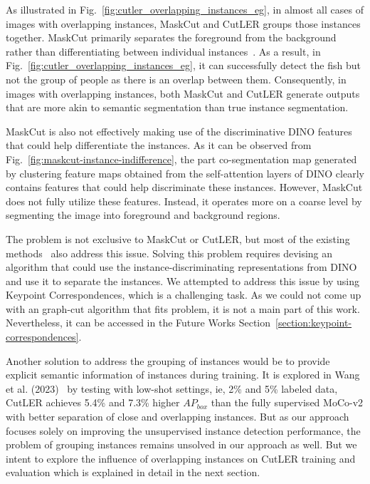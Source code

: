 As illustrated in Fig.~\ref{fig:cutler_overlapping_instances_eg}, in almost all cases of images with overlapping instances, MaskCut and CutLER groups those instances together. MaskCut primarily separates the foreground from the background rather than differentiating between individual instances~\cite{engstler2023understanding}. As a result, in Fig.~\ref{fig:cutler_overlapping_instances_eg}, it can successfully detect the fish but not the group of people as there is an overlap between them. Consequently, in images with overlapping instances, both MaskCut and CutLER generate outputs that are more akin to semantic segmentation than true instance segmentation.

MaskCut is also not effectively making use of the discriminative  DINO features that could help differentiate the instances. As it can be observed from Fig.~\ref{fig:maskcut-instance-indifference}, the part co-segmentation map generated by clustering feature maps obtained from the self-attention layers of DINO clearly contains features that could help discriminate these instances. However, MaskCut does not fully utilize these features. Instead, it operates more on a coarse level by segmenting the image into foreground and background regions. 

The problem is not exclusive to MaskCut or CutLER, but most of the existing methods~\cite{engstler2023understanding, cond1_support_2, Wang_2022_CVPR} also address this issue. Solving this problem requires devising an algorithm that could use the instance-discriminating representations from DINO and use it to separate the instances. We attempted to address this issue by using Keypoint Correspondences, which is a challenging task. As we could not come up with an graph-cut algorithm that fits problem, it is not a main part of this work. Nevertheless, it can be accessed in the Future Works Section~\ref{section:keypoint-correspondences}.

Another solution to address the grouping of instances would be to provide explicit semantic information of instances during training. It is explored in Wang et al. (2023)~\cite{wang2023cut} by testing with low-shot settings, ie, 2\% and 5\% labeled data, CutLER achieves 5.4\% and 7.3\% higher \(AP_{box}\) than the fully supervised MoCo-v2 with better separation of close and overlapping instances. But as our approach focuses solely on improving the unsupervised instance detection performance, the problem of grouping instances remains unsolved in our approach as well. But we intent to explore the influence of overlapping instances on CutLER training and evaluation which is explained in detail in the next section.


